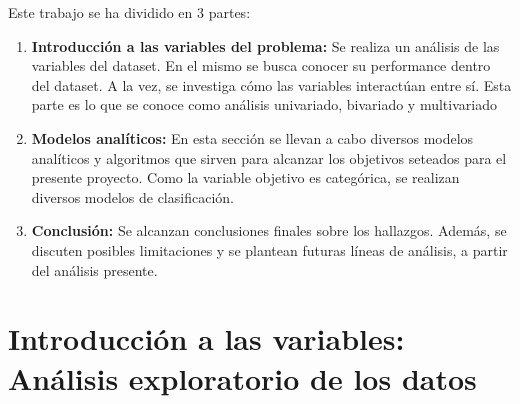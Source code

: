 \documentclass[a4paper]{article}
\begin{document}
        Este trabajo se ha dividido en 3 partes:
        \begin{enumerate}
            \item \textbf{Introducción a las variables del problema:} Se realiza un análisis de las variables del dataset. En el mismo se busca conocer su performance dentro del dataset. A la vez, se investiga cómo las variables interactúan entre sí. Esta parte es lo que se conoce como análisis univariado, bivariado y multivariado
            \item \textbf{Modelos analíticos:} En esta sección se llevan a cabo diversos modelos analíticos y algoritmos que sirven para alcanzar los objetivos seteados para el presente proyecto. Como la variable objetivo es categórica, se realizan diversos modelos de clasificación.
            \item \textbf{Conclusión:} Se alcanzan conclusiones finales sobre los hallazgos. Además, se discuten posibles limitaciones y se plantean futuras líneas de análisis, a partir del análisis presente.
            
        \end{enumerate}

\newpage

\section{Introducción a las variables: Análisis exploratorio de los datos}
 
\end{document}
